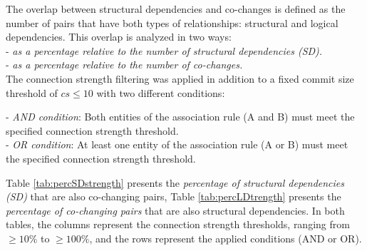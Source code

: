 The overlap between structural dependencies and co-changes is defined as the number of pairs that have both types of relationships: structural and logical dependencies. This overlap is analyzed in two ways:\\
\hspace{-4em}- \textit{as a percentage relative to the number of structural dependencies (SD).}\\
- \textit{as a percentage relative to the number of co-changes.}\\

The connection strength filtering was applied in addition to a fixed commit size threshold of \(cs \leq 10\) with two different conditions:   

\hspace{-4em}- \textit{AND condition}: Both entities of the association rule (A and B) must meet the specified connection strength threshold. \\  
- \textit{OR condition}: At least one entity of the association rule (A or B) must meet the specified connection strength threshold.

Table \ref{tab:percSDstrength} presents the \textit{percentage of structural dependencies (SD)} that are also co-changing pairs, Table \ref{tab:percLDtrength} presents the \textit{percentage of co-changing pairs} that are also structural dependencies. In both tables, the columns represent the connection strength thresholds, ranging from \( \geq 10\% \) to \( \geq 100\% \), and the rows represent the applied conditions (AND or OR).



\begin{table}[!h]
\renewcommand{\arraystretch}{1}
\caption{Percentage of structural dependencies (SD) that are also co-changing pairs after applying connection strength filtering and a commit size threshold of $cs \leq 10$.}
\label{tab:percSDstrength}
\centering
{}
\end{table}

